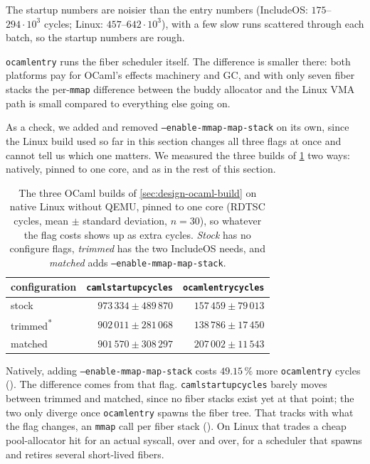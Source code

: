 \documentclass[12pt]{report}
\newcommand{\fullref}[1]{\Cref{#1}}
\renewcommand{\_}{\origunderscore\allowbreak}
\begin{document}
The startup numbers are noisier than the entry numbers (IncludeOS: $175$--$294\cdot10^{3}$ cycles; Linux: $457$--$642\cdot10^{3}$), with a few slow runs scattered through each batch, so the startup numbers are rough.

\texttt{ocaml\_entry} runs the fiber scheduler itself. The difference is smaller there: both platforms pay for OCaml's effects machinery and GC, and with only seven fiber stacks the per-\texttt{mmap} difference between the buddy allocator and the Linux VMA path is small compared to everything else going on.

As a check, we added and removed \texttt{--enable-mmap-map-stack} on its own, since the Linux build used so far in this section changes all three flags at once and cannot tell us which one matters. We measured the three builds of \cref{tab:mapstack-linux} two ways: natively, pinned to one core, and as in the rest of this section.

\begin{table}[h]
\centering
\caption{The three OCaml builds of \cref{sec:design-ocaml-build} on native Linux without QEMU, pinned to one core (RDTSC cycles, mean $\pm$ standard deviation, $n=30$), so whatever the flag costs shows up as extra cycles. \emph{Stock} has no configure flags, \emph{trimmed} has the two IncludeOS needs, and \emph{matched} adds \texttt{--enable-mmap-map-stack}.}
\label{tab:mapstack-linux}
\begin{tabular}{lrr}
  \toprule
  configuration & \texttt{caml\_startup\_cycles} & \texttt{ocaml\_entry\_cycles} \\
  \midrule
  stock    & $973\,334 \pm 489\,870$ & $157\,459 \pm 79\,013$ \\
  trimmed\textsuperscript{*}  & $902\,011 \pm 281\,068$ & $138\,786 \pm 17\,450$ \\
  matched  & $901\,570 \pm 308\,297$ & $207\,002 \pm 11\,543$ \\
  \bottomrule
\end{tabular}
\end{table}

Natively, adding \texttt{--enable-mmap-map-stack} costs $49.15\,\%$ more \texttt{ocaml\_entry} cycles (). The difference comes from that flag. \texttt{caml\_startup\_cycles} barely moves between trimmed and matched, since no fiber stacks exist yet at that point; the two only diverge once \texttt{ocaml\_entry} spawns the fiber tree. That tracks with what the flag changes, an \texttt{mmap} call per fiber stack (\fullref{sec:design-ocaml-build}). On Linux that trades a cheap pool-allocator hit for an actual syscall, over and over, for a scheduler that spawns and retires several short-lived fibers.
\end{document}
